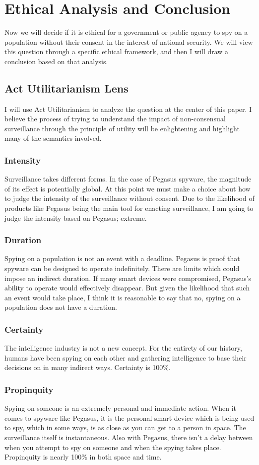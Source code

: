\documentclass[sigconf]{acmart}
\begin{document}
\section{Ethical Analysis and Conclusion}
Now we will decide if it is ethical for a government or public agency to spy on a population without their consent in the interest of national security. We will view this question through a specific ethical framework, and then I will draw a conclusion based on that analysis.
\subsection{Act Utilitarianism Lens}
I will use Act Utilitarianism to analyze the question at the center of this paper. I believe the process of trying to understand the impact of non-consensual surveillance through the principle of utility will be enlightening and highlight many of the semantics involved.
\subsubsection{Intensity}
Surveillance takes different forms. In the case of Pegasus spyware, the magnitude of its effect is potentially global. At this point we must make a choice about how to judge the intensity of the surveillance without consent. Due to the likelihood of products like Pegasus being the main tool for enacting surveillance, I am going to judge the intensity based on Pegasus; extreme.
\subsubsection{Duration}
Spying on a population is not an event with a deadline. Pegasus is proof that spyware can be designed to operate indefinitely. There are limits which could impose an indirect duration. If many smart devices were compromised, Pegasus's ability to operate would effectively disappear. But given the likelihood that such an event would take place, I think it is reasonable to say that no, spying on a population does not have a duration.
\subsubsection{Certainty}
The intelligence industry is not a new concept. For the entirety of our history, humans have been spying on each other and gathering intelligence to base their decisions on in many indirect ways. Certainty is 100\%.
\subsubsection{Propinquity}
Spying on someone is an extremely personal and immediate action. When it comes to spyware like Pegasus, it is the personal smart device which is being used to spy, which in some ways, is as close as you can get to a person in space. The surveillance itself is instantaneous. Also with Pegasus, there isn't a delay between when you attempt to spy on someone and when the spying takes place. Propinquity is nearly 100\% in both space and time.
\end{document}
